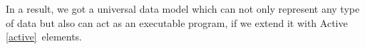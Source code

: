 \clearpage
{}\label{active}\secdown


In a result, we got a universal data model which can not only represent any type
of data but also can act as an executable program, if we extend it with Active
\ref{active}\ elements.



\secup

